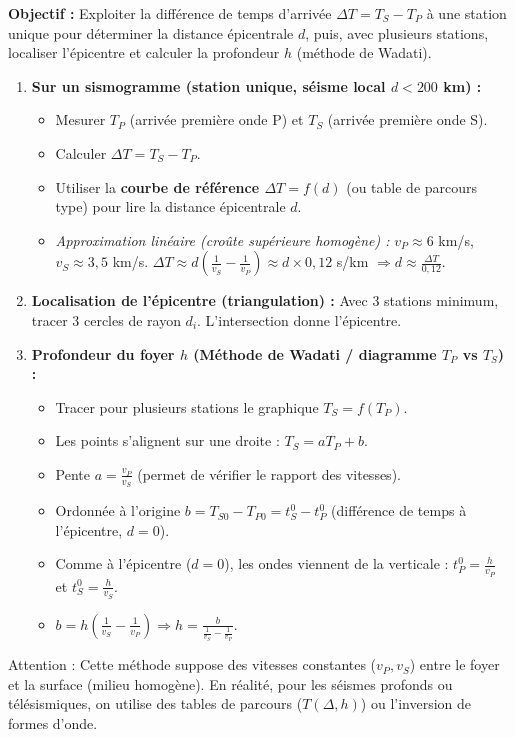 \documentclass[11pt]{article}
\newcommand{\cle}[1]{{\popxbold\color{popdark}#1}}
\begin{document}
\begin{methode}
\textbf{Objectif :} Exploiter la différence de temps d'arrivée $\Delta T = T_S - T_P$ à une station unique pour déterminer la distance épicentrale $d$, puis, avec plusieurs stations, localiser l'épicentre et calculer la profondeur $h$ (méthode de Wadati).
\begin{enumerate}
    \item \textbf{Sur un sismogramme (station unique, séisme local $d < 200$ km) :}
    \begin{itemize}
        \item Mesurer $T_P$ (arrivée première onde P) et $T_S$ (arrivée première onde S).
        \item Calculer $\Delta T = T_S - T_P$.
        \item Utiliser la \textbf{courbe de référence $\Delta T = f(d)$} (ou table de parcours type) pour lire la distance épicentrale $d$.
        \item \textit{Approximation linéaire (croûte supérieure homogène) :} $v_P \approx 6$ km/s, $v_S \approx 3,5$ km/s. $\Delta T \approx d \left( \frac{1}{v_S} - \frac{1}{v_P} \right) \approx d \times 0,12$ s/km $\Rightarrow d \approx \frac{\Delta T}{0,12}$.
    \end{itemize}
    \item \textbf{Localisation de l'épicentre (triangulation) :} Avec 3 stations minimum, tracer 3 cercles de rayon $d_i$. L'intersection donne l'épicentre.
    \item \textbf{Profondeur du foyer $h$ (Méthode de Wadati / diagramme $T_P$ vs $T_S$) :}
    \begin{itemize}
        \item Tracer pour plusieurs stations le graphique $T_S = f(T_P)$.
        \item Les points s'alignent sur une droite : $T_S = a T_P + b$.
        \item Pente $a = \frac{v_P}{v_S}$ (permet de vérifier le rapport des vitesses).
        \item Ordonnée à l'origine $b = T_{S0} - T_{P0} = t_S^0 - t_P^0$ (différence de temps à l'épicentre, $d=0$).
        \item Comme à l'épicentre ($d=0$), les ondes viennent de la verticale : $t_P^0 = \frac{h}{v_P}$ et $t_S^0 = \frac{h}{v_S}$.
        \item $b = h \left( \frac{1}{v_S} - \frac{1}{v_P} \right) \Rightarrow \boxed{h = \frac{b}{\frac{1}{v_S} - \frac{1}{v_P}}}$.
    \end{itemize}
\end{enumerate}
\cle{Attention :} Cette méthode suppose des vitesses constantes ($v_P, v_S$) entre le foyer et la surface (milieu homogène). En réalité, pour les séismes profonds ou télésismiques, on utilise des tables de parcours ($T(\Delta, h)$) ou l'inversion de formes d'onde.
\end{methode}
\end{document}
